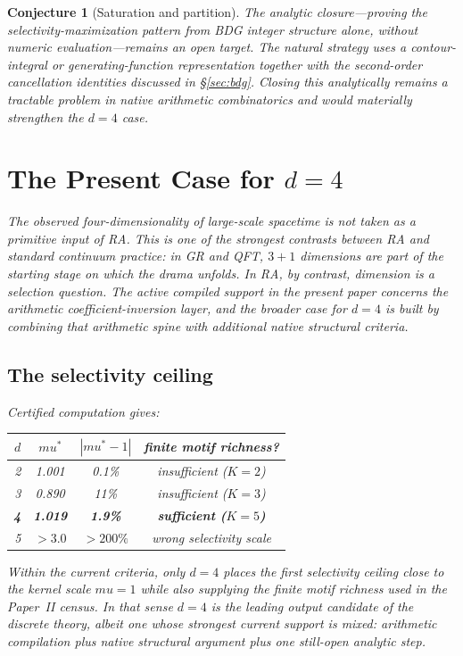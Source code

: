 \documentclass[11pt]{article}
\def\mu{mu}%
\newtheorem{conjecture}{Conjecture}
\begin{document}
\begin{conjecture}[Saturation and partition]
The analytic closure---proving the selectivity-maximization pattern from BDG integer structure alone, without numeric evaluation---remains an open target. The natural strategy uses a contour-integral or generating-function representation together with the second-order cancellation identities discussed in \S\ref{sec:bdg}. Closing this analytically remains a tractable problem in native arithmetic combinatorics and would materially strengthen the $d=4$ case.

\section{The Present Case for $d=4$}
\label{sec:d4}

The observed four-dimensionality of large-scale spacetime is not taken as a primitive input of RA. This is one of the strongest contrasts between RA and standard continuum practice: in GR and QFT, $3+1$ dimensions are part of the starting stage on which the drama unfolds. In RA, by contrast, dimension is a selection question. The active compiled support in the present paper concerns the arithmetic coefficient-inversion layer, and the broader case for $d=4$ is built by combining that arithmetic spine with additional native structural criteria.

\subsection{The selectivity ceiling}

Certified computation gives:
\begin{center}
\begin{tabular}{rccc}
\toprule
$d$ & $\mu^*$ & $|\mu^*-1|$ & finite motif richness? \\
\midrule
2 & 1.001 & 0.1\% & insufficient ($K=2$) \\
3 & 0.890 & 11\% & insufficient ($K=3$) \\
\textbf{4} & \textbf{1.019} & \textbf{1.9\%} & \textbf{sufficient ($K=5$)} \\
5 & $>3.0$ & $>200\%$ & wrong selectivity scale \\
\bottomrule
\end{tabular}
\end{center}

Within the current criteria, only $d=4$ places the first selectivity ceiling close to the kernel scale $\mu=1$ while also supplying the finite motif richness used in the Paper~II census. In that sense $d=4$ is the leading output candidate of the discrete theory, albeit one whose strongest current support is mixed: arithmetic compilation plus native structural argument plus one still-open analytic step.


\end{conjecture}
\end{document}
